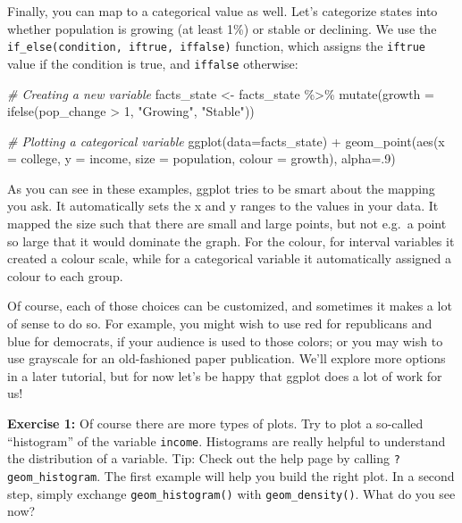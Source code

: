 \documentclass[
]{article}
\newenvironment{Shaded}{\begin{snugshade}}{\end{snugshade}}
\newcommand{\AttributeTok}[1]{\textcolor[rgb]{0.77,0.63,0.00}{#1}}
\newcommand{\CommentTok}[1]{\textcolor[rgb]{0.56,0.35,0.01}{\textit{#1}}}
\newcommand{\DecValTok}[1]{\textcolor[rgb]{0.00,0.00,0.81}{#1}}
\newcommand{\FunctionTok}[1]{\textcolor[rgb]{0.00,0.00,0.00}{#1}}
\newcommand{\NormalTok}[1]{#1}
\newcommand{\OtherTok}[1]{\textcolor[rgb]{0.56,0.35,0.01}{#1}}
\newcommand{\SpecialCharTok}[1]{\textcolor[rgb]{0.00,0.00,0.00}{#1}}
\newcommand{\StringTok}[1]{\textcolor[rgb]{0.31,0.60,0.02}{#1}}
\begin{document}
Finally, you can map to a categorical value as well. Let's categorize
states into whether population is growing (at least 1\%) or stable or
declining. We use the \texttt{if\_else(condition,\ iftrue,\ iffalse)}
function, which assigns the \texttt{iftrue} value if the condition is
true, and \texttt{iffalse} otherwise:

\begin{Shaded}
\begin{Highlighting}[]
\CommentTok{\# Creating a new variable}
\NormalTok{facts\_state }\OtherTok{\textless{}{-}}\NormalTok{ facts\_state }\SpecialCharTok{\%\textgreater{}\%} 
  \FunctionTok{mutate}\NormalTok{(}\AttributeTok{growth =} \FunctionTok{ifelse}\NormalTok{(pop\_change }\SpecialCharTok{\textgreater{}} \DecValTok{1}\NormalTok{, }\StringTok{"Growing"}\NormalTok{, }\StringTok{"Stable"}\NormalTok{))}

\CommentTok{\# Plotting a categorical variable}
\FunctionTok{ggplot}\NormalTok{(}\AttributeTok{data=}\NormalTok{facts\_state) }\SpecialCharTok{+} 
  \FunctionTok{geom\_point}\NormalTok{(}\FunctionTok{aes}\NormalTok{(}\AttributeTok{x =}\NormalTok{ college, }\AttributeTok{y =}\NormalTok{ income, }\AttributeTok{size =}\NormalTok{ population, }\AttributeTok{colour =}\NormalTok{ growth), }
             \AttributeTok{alpha=}\NormalTok{.}\DecValTok{9}\NormalTok{)}
\end{Highlighting}
\end{Shaded}

As you can see in these examples, ggplot tries to be smart about the
mapping you ask. It automatically sets the x and y ranges to the values
in your data. It mapped the size such that there are small and large
points, but not e.g.~a point so large that it would dominate the graph.
For the colour, for interval variables it created a colour scale, while
for a categorical variable it automatically assigned a colour to each
group.

Of course, each of those choices can be customized, and sometimes it
makes a lot of sense to do so. For example, you might wish to use red
for republicans and blue for democrats, if your audience is used to
those colors; or you may wish to use grayscale for an old-fashioned
paper publication. We'll explore more options in a later tutorial, but
for now let's be happy that ggplot does a lot of work for us!

\textbf{Exercise 1:} Of course there are more types of plots. Try to
plot a so-called ``histogram'' of the variable \texttt{income}.
Histograms are really helpful to understand the distribution of a
variable. Tip: Check out the help page by calling
\texttt{?geom\_histogram}. The first example will help you build the
right plot. In a second step, simply exchange \texttt{geom\_histogram()}
with \texttt{geom\_density()}. What do you see now?
\end{document}
